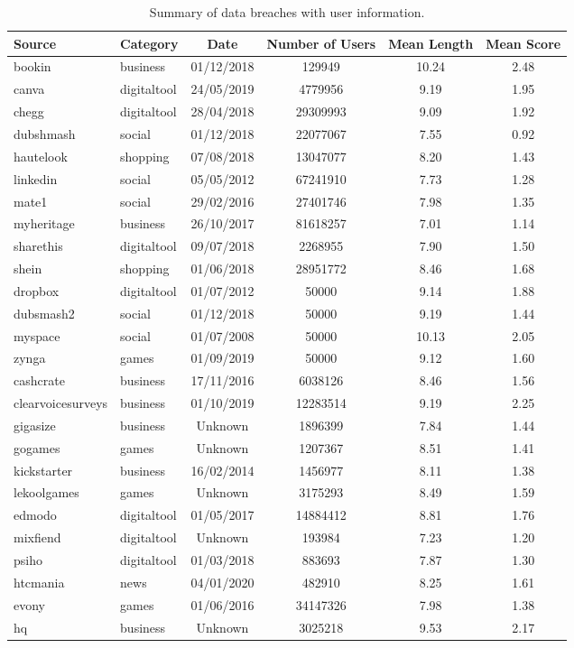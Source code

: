 \begin{table*}[h!]
\centering
\begin{tabular}{|l|l|c|c|c|c|}
\hline
\textbf{Source} & \textbf{Category} & \textbf{Date} & \textbf{Number of Users} & \textbf{Mean Length} & \textbf{Mean Score} \\
\hline
bookin & business & 01/12/2018  & 129949 & 10.24 & 2.48 \\
canva & digitaltool & 24/05/2019  & 4779956 & 9.19 & 1.95 \\
chegg & digitaltool & 28/04/2018  & 29309993 & 9.09 & 1.92 \\
dubshmash & social & 01/12/2018  & 22077067 & 7.55 & 0.92 \\
hautelook & shopping & 07/08/2018  & 13047077 & 8.20 & 1.43 \\
linkedin & social & 05/05/2012  & 67241910 & 7.73 & 1.28 \\
mate1 & social & 29/02/2016  & 27401746 & 7.98 & 1.35 \\
myheritage & business & 26/10/2017  & 81618257 & 7.01 & 1.14 \\
sharethis & digitaltool & 09/07/2018  & 2268955 & 7.90 & 1.50 \\
shein & shopping & 01/06/2018  & 28951772 & 8.46 & 1.68 \\
dropbox & digitaltool & 01/07/2012  & 50000 & 9.14 & 1.88 \\
dubsmash2 & social & 01/12/2018  & 50000 & 9.19 & 1.44 \\
myspace & social & 01/07/2008  & 50000 & 10.13 & 2.05 \\
zynga & games & 01/09/2019  & 50000 & 9.12 & 1.60 \\
cashcrate & business & 17/11/2016  & 6038126 & 8.46 & 1.56 \\
clearvoicesurveys & business & 01/10/2019  & 12283514 & 9.19 & 2.25 \\
gigasize & business & Unknown  & 1896399 & 7.84 & 1.44 \\
gogames & games & Unknown  & 1207367 & 8.51 & 1.41 \\
kickstarter & business & 16/02/2014  & 1456977 & 8.11 & 1.38 \\
lekoolgames & games & Unknown  & 3175293 & 8.49 & 1.59 \\
edmodo & digitaltool & 01/05/2017  & 14884412 & 8.81 & 1.76 \\
mixfiend & digitaltool & Unknown  & 193984 & 7.23 & 1.20 \\
psiho & digitaltool & 01/03/2018  & 883693 & 7.87 & 1.30 \\
htcmania & news & 04/01/2020  & 482910 & 8.25 & 1.61 \\
evony & games & 01/06/2016  & 34147326 & 7.98 & 1.38 \\
hq & business & Unknown  & 3025218 & 9.53 & 2.17 \\
\hline
\end{tabular}
\caption{Summary of data breaches with user information.}
\end{table*}

